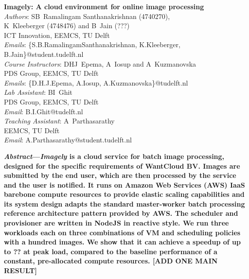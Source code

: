 \documentclass[a4paper]{IEEEtran}
\begin{document}
\setlength{\tabcolsep}{10pt}
\renewcommand{\arraystretch}{1.25}

\begin{center}
  \textbf{\Large{
    Imagely: A cloud environment for online image processing
  }}\\
  \vspace{0.25cm}
  \emph{Authors}: SB~Ramalingam Santhanakrishnan (4740270), \\ K~Kleeberger (4748476) and B~Jain (???)\\
  ICT Innovation, EEMCS, TU Delft\\
  \emph{Emails}: \{S.B.RamalingamSanthanakrishnan, K.Kleeberger, B.Jain\}@student.tudelft.nl\\
  \vspace{0.2cm}
  \emph{Course Instructors}: DHJ~Epema, A~Iosup and A~Kuzmanovska\\
  PDS Group, EEMCS, TU Delft\\
  \emph{Emails}: \{D.H.J.Epema, A.Iosup, A.Kuzmanovska\}@tudelft.nl\\
  \vspace{0.2cm}
  \emph{Lab Assistant}: BI~Ghit\\
  PDS Group, EEMCS, TU Delft\\
  \emph{Email}: B.I.Ghit@tudelft.nl\\
  \vspace{0.2cm}
  \emph{Teaching Assistant}: A~Parthasarathy\\
  EEMCS, TU Delft\\
  \emph{Email}: A.Parthasarathy@student.tudelft.nl\\
\end{center}

\vspace{0.2cm}

\textbf{
  \emph{Abstract}---\emph{Imagely} is a cloud service for batch image processing, designed for the specific requirements of WantCloud BV. Images are submitted by the end user, which are then processed by the service and the user is notified. It runs on Amazon Web Services (AWS) IaaS barebone compute resources to provide elastic scaling capabilities and its system design adapts the standard master-worker batch processing reference architecture pattern provided by AWS. The scheduler and provisioner are written in NodeJS in reactive style. We run three workloads each on three combinations of VM and scheduling policies with a hundred images. We show that it can achieve a speedup of up to ?? at peak load, compared to the baseline performance of a constant, pre-allocated compute resources. [ADD ONE MAIN RESULT]
}
\end{document}
